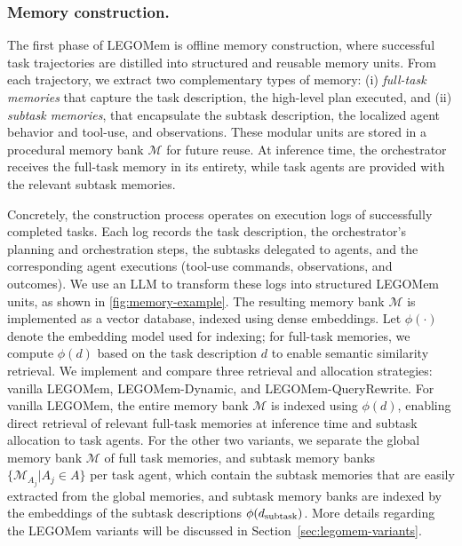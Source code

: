 \documentclass[sigconf]{aamas}
\newcommand{\legomem}{LEGOMem}
\newcommand{\dynalegomem}{LEGOMem-Dynamic}
\newcommand{\queryrewritelegomem}{LEGOMem-QueryRewrite}
\begin{document}
\subsubsection{Memory construction.}

The first phase of \legomem{} is offline memory construction, where successful task trajectories are distilled into structured and reusable memory units. 
From each trajectory, we extract two complementary types of memory: 
(i) \emph{full-task memories} that capture the task description, the high-level plan executed, and  
(ii) \emph{subtask memories}, that encapsulate the subtask description, the localized agent behavior and tool-use, and observations.  
These modular units are stored in a procedural memory bank $\mathcal{M}$ for future reuse. 
At inference time, the orchestrator receives the full-task memory in its entirety, while task agents are provided with the relevant subtask memories.  

Concretely, the construction process operates on execution logs of successfully completed tasks. Each log records the task description, the orchestrator’s planning and orchestration steps, the subtasks delegated to agents, and the corresponding agent executions (tool-use commands, observations, and outcomes). 
We use an LLM to transform these logs into structured \legomem{} units, as shown in \autoref{fig:memory-example}.  
The resulting memory bank $\mathcal{M}$ is implemented as a vector database, indexed using dense embeddings. 
Let $\phi(\cdot)$ denote the embedding model used for indexing; for full-task memories, we compute $\phi(d)$ based on the task description $d$ to enable semantic similarity retrieval.  
We implement and compare three retrieval and allocation strategies: vanilla \legomem{}, \dynalegomem{}, and \queryrewritelegomem{}.  
For vanilla \legomem{}, the entire memory bank $\mathcal{M}$ is indexed using $\phi(d)$, enabling direct retrieval of relevant full-task memories at inference time and subtask allocation to task agents. For the other two variants, we separate the global memory bank $\mathcal{M}$ of full task memories, and subtask memory banks $\{\mathcal{M}_{A_j} | A_j\in A\}$ per task agent, which contain the subtask memories that are easily extracted from the global memories, and subtask memory banks are indexed by the embeddings of the subtask descriptions $\phi(d_\textnormal{subtask})$. More details regarding the \legomem{} variants will be discussed in Section~\ref{sec:legomem-variants}.
\end{document}
